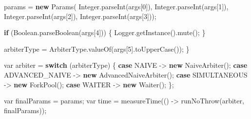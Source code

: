 \documentclass[11pt]{article}
\newenvironment{Shaded}{}{}
\newcommand{\KeywordTok}[1]{\textcolor[rgb]{0.00,0.44,0.13}{\textbf{{#1}}}}
\newcommand{\DataTypeTok}[1]{\textcolor[rgb]{0.56,0.13,0.00}{{#1}}}
\newcommand{\DecValTok}[1]{\textcolor[rgb]{0.25,0.63,0.44}{{#1}}}
\newcommand{\FunctionTok}[1]{\textcolor[rgb]{0.02,0.16,0.49}{{#1}}}
\newcommand{\NormalTok}[1]{{#1}}
\newcommand{\ControlFlowTok}[1]{\textcolor[rgb]{0.00,0.44,0.13}{\textbf{{#1}}}}
\newcommand{\OperatorTok}[1]{\textcolor[rgb]{0.40,0.40,0.40}{{#1}}}
\newcommand{\BuiltInTok}[1]{{#1}}
\begin{document}
\begin{Shaded}
\begin{Highlighting}[]
\NormalTok{            params }\OperatorTok{=} \KeywordTok{new} \FunctionTok{Params}\OperatorTok{(}
                    \BuiltInTok{Integer}\OperatorTok{.}\FunctionTok{parseInt}\OperatorTok{(}\NormalTok{args}\OperatorTok{[}\DecValTok{0}\OperatorTok{]),}
                    \BuiltInTok{Integer}\OperatorTok{.}\FunctionTok{parseInt}\OperatorTok{(}\NormalTok{args}\OperatorTok{[}\DecValTok{1}\OperatorTok{]),}
                    \BuiltInTok{Integer}\OperatorTok{.}\FunctionTok{parseInt}\OperatorTok{(}\NormalTok{args}\OperatorTok{[}\DecValTok{2}\OperatorTok{]),}
                    \BuiltInTok{Integer}\OperatorTok{.}\FunctionTok{parseInt}\OperatorTok{(}\NormalTok{args}\OperatorTok{[}\DecValTok{3}\OperatorTok{]));}

            \ControlFlowTok{if} \OperatorTok{(}\BuiltInTok{Boolean}\OperatorTok{.}\FunctionTok{parseBoolean}\OperatorTok{(}\NormalTok{args}\OperatorTok{[}\DecValTok{4}\OperatorTok{]))} \OperatorTok{\{}
                \BuiltInTok{Logger}\OperatorTok{.}\FunctionTok{getInstance}\OperatorTok{().}\FunctionTok{mute}\OperatorTok{();}
            \OperatorTok{\}}

\NormalTok{            arbiterType }\OperatorTok{=}\NormalTok{ ArbiterType}\OperatorTok{.}\FunctionTok{valueOf}\OperatorTok{(}\NormalTok{args}\OperatorTok{[}\DecValTok{5}\OperatorTok{].}\FunctionTok{toUpperCase}\OperatorTok{());}
        \OperatorTok{\}}

        \DataTypeTok{var}\NormalTok{ arbiter }\OperatorTok{=} \ControlFlowTok{switch} \OperatorTok{(}\NormalTok{arbiterType}\OperatorTok{)} \OperatorTok{\{}
            \ControlFlowTok{case}\NormalTok{ NAIVE }\OperatorTok{{-}\textgreater{}} \KeywordTok{new} \FunctionTok{NaiveArbiter}\OperatorTok{();}
            \ControlFlowTok{case}\NormalTok{ ADVANCED\_NAIVE }\OperatorTok{{-}\textgreater{}} \KeywordTok{new} \FunctionTok{AdvancedNaiveArbiter}\OperatorTok{();}
            \ControlFlowTok{case}\NormalTok{ SIMULTANEOUS }\OperatorTok{{-}\textgreater{}} \KeywordTok{new} \FunctionTok{ForkPool}\OperatorTok{();}
            \ControlFlowTok{case}\NormalTok{ WAITER }\OperatorTok{{-}\textgreater{}} \KeywordTok{new} \FunctionTok{Waiter}\OperatorTok{();}
        \OperatorTok{\};}

        \DataTypeTok{var}\NormalTok{ finalParams }\OperatorTok{=}\NormalTok{ params}\OperatorTok{;}
        \DataTypeTok{var}\NormalTok{ time }\OperatorTok{=} \FunctionTok{measureTime}\OperatorTok{(()} \OperatorTok{{-}\textgreater{}} \FunctionTok{runNoThrow}\OperatorTok{(}\NormalTok{arbiter}\OperatorTok{,}\NormalTok{ finalParams}\OperatorTok{));}


\end{Highlighting}
\end{Shaded}
\end{document}
